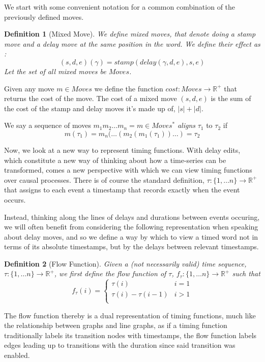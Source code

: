 \documentclass[conference]{IEEEtran}
\newcounter{cases}
\newtheorem{definition}{Definition}
\begin{document}
	We start with some convenient notation for a common combination of the previously defined moves. 
	
	\begin{definition}[Mixed Move]
		We define \textit{mixed moves}, that denote doing a stamp move and a delay move at the same position in the word. 
		We define their effect as : $$(s, d, e)(\gamma) = stamp(delay(\gamma, d, e), s, e)$$
		Let the set of all mixed moves be $Moves$. 
	\end{definition}
	
	Given any move $m \in Moves$ we define the function $cost : Moves \to \mathbb{R}^+$ that returns the cost of the move.  
	The cost of a mixed move $(s, d, e)$ is the sum of the cost of the stamp and delay moves it's made up of, $|s| + |d|$.
	
	We say a sequence of moves $m_1m_2\dots m_n = m \in Moves^*$ \textit{aligns} $\tau_1$ to $\tau_2$ if $$m(\tau_1) = m_n(\dots (m_2(m_1(\tau_1))\dots) = \tau_2$$
	
Now, we look at a new way to represent timing functions. With delay edits, which constitute a new way of thinking about how a time-series can be transformed, comes a new perspective with which we can view timing functions over causal processes. 
	There is of course the standard definition, $\tau : \{1, \dots n\} \to \mathbb{R}^+$ that assigns to each event a timestamp that records exactly when the event occurs. 
	
	Instead, thinking along the lines of delays and durations between events occuring, we will often benefit from considering the following representation when speaking about delay moves, and so we define a way by which to view a timed word not in terms of its absolute timestamps, but by the delays between relevant timestamps. 
	
	\begin{definition}[Flow Function]
		Given a (not necessarily valid) time sequence,  $\tau : \{1, \dots n\} \to \mathbb{R}^+$, we first define the \textit{flow} function of $\tau$, $f_{\tau} : \{1, \dots n\} \to \mathbb{R}^+$ such that 
		$$f_{\tau}(i) = \begin{cases} 
			\tau(i) & i = 1\\
			\tau(i) - \tau(i-1) &i > 1\\
		\end{cases}
		$$
		
	\end{definition}
	
	The flow function thereby is a dual representation of timing functions, much like the relationship between graphs and line graphs, as if a timing function traditionally labels its transition nodes with timestamps, the flow function labels edges leading up to transitions with the duration since said transition was enabled. 
	
\end{document}
